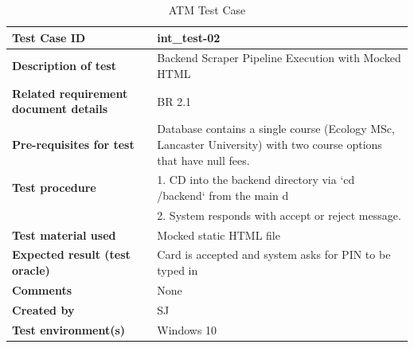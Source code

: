 \begin{table}[h]
\small
\renewcommand{\arraystretch}{1.1}
\begin{tabularx}{\linewidth}{>{\bfseries}l X}
\hline
Test Case ID & int\_test-02 \\ \hline
Description of test & Backend Scraper Pipeline Execution with Mocked HTML \\ \hline
Related requirement document details & BR 2.1 \\ \hline
Pre-requisites for test & Database contains a single course (Ecology MSc, Lancaster University) with two course options that have null fees. \\ \hline
Test procedure & 
1. CD into the backend directory via `cd /backend` from the main d \\
& 2. System responds with accept or reject message. \\ \hline
Test material used & Mocked static HTML file \\ \hline
Expected result (test oracle) & Card is accepted and system asks for PIN to be typed in \\ \hline
Comments & None \\ \hline
Created by & SJ \\ \hline
Test environment(s) & Windows 10 \\ \hline
\end{tabularx}
\caption{ATM Test Case}
\end{table}


